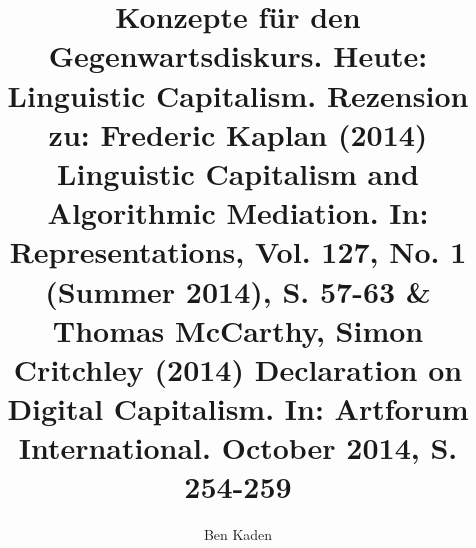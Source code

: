 
\fancyhead[R]{\thepage} %

\title{\LARGE{Konzepte für den Gegenwartsdiskurs. Heute: Linguistic Capitalism. Rezension zu: Frederic Kaplan (2014) Linguistic Capitalism and Algorithmic Mediation. In: Representations, Vol. 127, No. 1 (Summer 2014), S. 57-63 \& Thomas McCarthy, Simon Critchley (2014) Declaration on Digital Capitalism. In: Artforum International. October 2014, S. 254-259}} %
\author{Ben Kaden} %

\setcounter{page}{83}